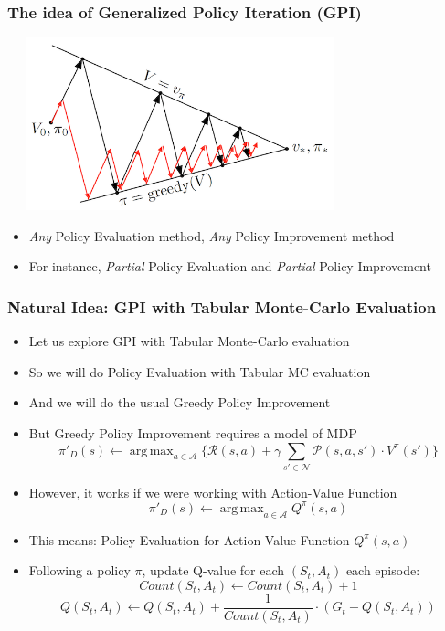 \documentclass[handout]{beamer}
\DeclareMathOperator*{\argmax}{arg\,max}
\begin{document}
\begin{frame}
\frametitle{The idea of Generalized Policy Iteration (GPI)}
\includegraphics[width=10cm, height=5cm]{gpi.png}
\pause
\begin{itemize}[<+->]
\item {\em Any} Policy Evaluation method, {\em Any} Policy Improvement method
\item For instance, {\em Partial} Policy Evaluation and {\em Partial} Policy Improvement
\end{itemize}
\end{frame}

\begin{frame}
\frametitle{Natural Idea: GPI with Tabular Monte-Carlo Evaluation}
\begin{itemize}[<+->]
\item Let us explore GPI with Tabular Monte-Carlo evaluation
\item So we will do Policy Evaluation with Tabular MC evaluation
\item And we will do the usual Greedy Policy Improvement
\item But Greedy Policy Improvement requires a model of MDP
$$\pi'_D(s) \leftarrow  \argmax_{a\in \mathcal{A}} \{\mathcal{R}(s,a) + \gamma \sum_{s' \in \mathcal{N}} \mathcal{P}(s,a,s') \cdot V^{\pi}(s') \}$$
\item However, it works if we were working with Action-Value Function
$$\pi'_D(s) \leftarrow \argmax_{a\in \mathcal{A}} Q^{\pi}(s,a)$$
\item This means: Policy Evaluation for Action-Value Function $Q^{\pi}(s,a)$
\item Following a policy $\pi$, update Q-value for each $(S_t,A_t)$ each episode:
$$Count(S_t,A_t) \leftarrow Count(S_t,A_t) + 1$$
$$Q(S_t,A_t) \leftarrow Q(S_t,A_t) + \frac 1 {Count(S_t, A_t)} \cdot (G_t - Q(S_t,A_t))$$
\end{itemize}
\end{frame}
\end{document}
